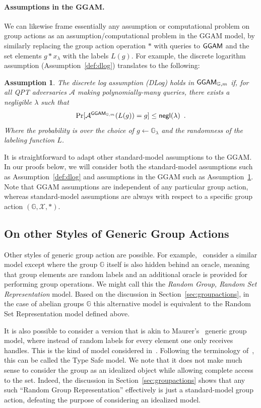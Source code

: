 \documentclass{article}\usepackage[a4paper,margin=20mm]{geometry}
\newtheorem{assumption}[theorem]{Assumption}
\numberwithin{theorem}{section}
\numberwithin{equation}{section}
\newcommand{\G}{\mathbb{G}}
\newcommand{\As}{{\mathcal{A}}}
\newcommand{\Xs}{{\mathcal{X}}}
\newcommand{\negl}{{\sf negl}}
\newcommand{\GGAM}{{\sf GGAM}}
\begin{document}
\paragraph{Assumptions in the GGAM.} We can likewise frame essentially any assumption or computational problem on group actions as an assumption/computational problem in the GGAM model, by similarly replacing the group action operation $*$ with queries to $\GGAM$ and the set elements $g*x_\lambda$ with the labels $L(g)$. For example, the discrete logarithm assumption (Assumption~\ref{def:dlog}) translates to the following:

\begin{assumption}\label{def:dlogGGAM} The \emph{discrete log assumption} (DLog) holds in $\GGAM_{\G,m}$ if, for all QPT adversaries $\As$ making polynomially-many queries, there exists a negligible $\lambda$ such that
	\[\Pr[\As^{\GGAM_{\G,m}}(L(g))=g]\leq\negl(\lambda)\enspace .\]
	Where the probability is over the choice of $g\gets\G_\lambda$ and the randomness of the labeling function $L$.
\end{assumption}
It is straightforward to adapt other standard-model assumptions to the GGAM. In our proofs below, we will consider both the standard-model assumptions such as Assumption~\ref{def:dlog} and assumptions in the GGAM such as Assumption~\ref{def:dlogGGAM}. Note that GGAM assumptions are independent of any particular group action, whereas standard-model assumptions are always with respect to a specific group action $(\G,\Xs,*)$.


\subsection{On other Styles of Generic Group Actions}

Other styles of generic group action are possible. For example,~\cite{DBLP:journals/joc/MontgomeryZ24} consider a similar model except where the group $\G$ itself is also hidden behind an oracle, meaning that group elements are random labels and an additional oracle is provided for performing group operations. We might call this the \emph{Random Group, Random Set Representation} model. Based on the discussion in Section~\ref{sec:groupactions}, in the case of abelian groups $\G$ this alternative model is equivalent to the Random Set Representation model defined above.

It is also possible to consider a version that is akin to Maurer's~\cite{IMA:Maurer05} generic group model, where instead of random labels for every element one only receives handles. This is the kind of model considered in~\cite{EC:BonGuaZha23,EPRINT:OrsZan23}. Following the terminology of~\cite{C:Zhandry22b}, this can be called the Type Safe model. We note that it does not make much sense to consider the group as an idealized object while allowing complete access to the set. Indeed, the discussion in Section~\ref{sec:groupactions} shows that any such ``Random Group Representation'' effectively is just a standard-model group action, defeating the purpose of considering an idealized model.
\end{document}
